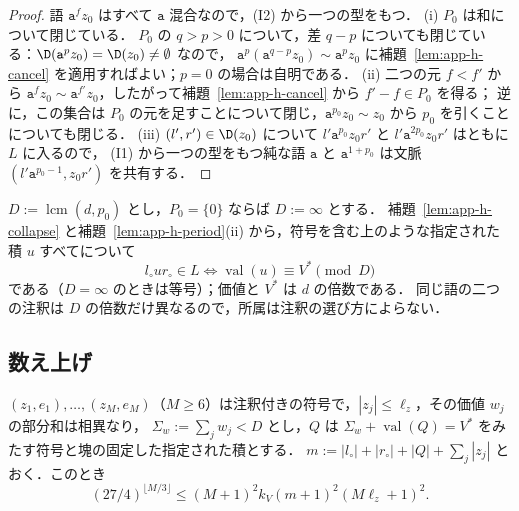 \begin{proof}
語 $\mathtt a^fz_0$ はすべて $\mathtt a$ 混合なので，(I2) から一つの型をもつ．
(i) $P_0$ は和について閉じている．
$P_0$ の $q>p>0$ について，差 $q-p$ についても閉じている：$\D(\mathtt a^pz_0)=\D(z_0)\ne\emptyset$ なので，
$\mathtt a^p(\mathtt a^{q-p}z_0)\sim\mathtt a^pz_0$ に補題~\ref{lem:app-h-cancel} を適用すればよい；$p=0$ の場合は自明である．
(ii) 二つの元 $f<f'$ から $\mathtt a^fz_0\sim\mathtt a^{f'}z_0$，したがって補題~\ref{lem:app-h-cancel} から $f'-f\in P_0$ を得る；
逆に，この集合は $P_0$ の元を足すことについて閉じ，$\mathtt a^{p_0}z_0\sim z_0$ から $p_0$ を引くことについても閉じる．
(iii) $(l',r')\in\D(z_0)$ について $l'\mathtt a^{p_0}z_0r'$ と $l'\mathtt a^{2p_0}z_0r'$ はともに $L$ に入るので，
(I1) から一つの型をもつ純な語 $\mathtt a$ と $\mathtt a^{1+p_0}$ は文脈 $(l'\mathtt a^{p_0-1},z_0r')$ を共有する．
\end{proof}

$D:=\operatorname{lcm}(d,p_0)$ とし，$P_0=\{0\}$ ならば $D:=\infty$ とする．
補題~\ref{lem:app-h-collapse} と補題~\ref{lem:app-h-period}(ii) から，符号を含む上のような指定された積 $u$ すべてについて
\begin{equation}
\label{eq:app-h-member}
 l_\circ ur_\circ\in L\iff\operatorname{val}(u)\equiv V^*\pmod D
\end{equation}
である（$D=\infty$ のときは等号）；価値と $V^*$ は $d$ の倍数である．
同じ語の二つの注釈は $D$ の倍数だけ異なるので，所属は注釈の選び方によらない．

\subsection{数え上げ}

\begin{lemma}
\label{lem:app-h-count}
$(z_1,e_1),\ldots,(z_M,e_M)$（$M\ge6$）は注釈付きの符号で，$|z_j|\le\ell_z$，その価値 $w_j$ の部分和は相異なり，
$\Sigma_w:=\sum_jw_j<D$ とし，$Q$ は $\Sigma_w+\operatorname{val}(Q)=V^*$ をみたす符号と塊の固定した指定された積とする．
$m:=|l_\circ|+|r_\circ|+|Q|+\sum_j|z_j|$ とおく．このとき
\[
 (27/4)^{\lfloor M/3\rfloor}\le(M+1)^2k_V(m+1)^2(M\ell_z+1)^2.
\]
\end{lemma}


